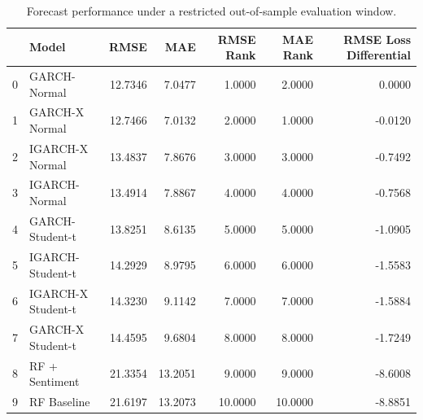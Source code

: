 \begin{table}
\caption{Forecast performance under a restricted out-of-sample evaluation window.}
\label{tab:robustness_restricted_window}
\begin{tabular}{llrrrrr}
\toprule
 & Model & RMSE & MAE & RMSE Rank & MAE Rank & RMSE Loss Differential \\
\midrule
0 & GARCH-Normal & 12.7346 & 7.0477 & 1.0000 & 2.0000 & 0.0000 \\
1 & GARCH-X Normal & 12.7466 & 7.0132 & 2.0000 & 1.0000 & -0.0120 \\
2 & IGARCH-X Normal & 13.4837 & 7.8676 & 3.0000 & 3.0000 & -0.7492 \\
3 & IGARCH-Normal & 13.4914 & 7.8867 & 4.0000 & 4.0000 & -0.7568 \\
4 & GARCH-Student-t & 13.8251 & 8.6135 & 5.0000 & 5.0000 & -1.0905 \\
5 & IGARCH-Student-t & 14.2929 & 8.9795 & 6.0000 & 6.0000 & -1.5583 \\
6 & IGARCH-X Student-t & 14.3230 & 9.1142 & 7.0000 & 7.0000 & -1.5884 \\
7 & GARCH-X Student-t & 14.4595 & 9.6804 & 8.0000 & 8.0000 & -1.7249 \\
8 & RF + Sentiment & 21.3354 & 13.2051 & 9.0000 & 9.0000 & -8.6008 \\
9 & RF Baseline & 21.6197 & 13.2073 & 10.0000 & 10.0000 & -8.8851 \\
\bottomrule
\end{tabular}
\end{table}
